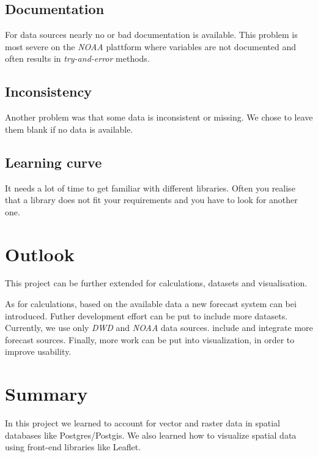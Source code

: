 \documentclass{scrartcl}
\begin{document}
\subsection{Documentation}
For data sources nearly no or bad documentation is available. This problem
is most severe on the \textit{NOAA} plattform where variables are not
documented and often results in \textit{try-and-error} methods.

\subsection{Inconsistency}
Another problem was that some data is inconsistent or missing. We chose to leave
them blank if no data is available.

\subsection{Learning curve}
It needs a lot of time to get familiar with different libraries. Often you
realise that a library does not fit your requirements and you have to look for
another one.


\section{Outlook}
This project can be further extended for calculations, datasets and
visualisation.

As for calculations, based on the available data a new forecast system can bei
introduced. 
Futher development effort can be put to include more datasets. Currently, we
use only \textit{DWD} and \textit{NOAA} data sources. include and integrate
more forecast sources. Finally, more work can be put into visualization, in
order to improve usability. 


\section{Summary}
In this project we learned to account for vector and raster data in spatial
databases like Postgres/Postgis. We also learned how to visualize spatial data
using front-end libraries like Leaflet.
\end{document}

